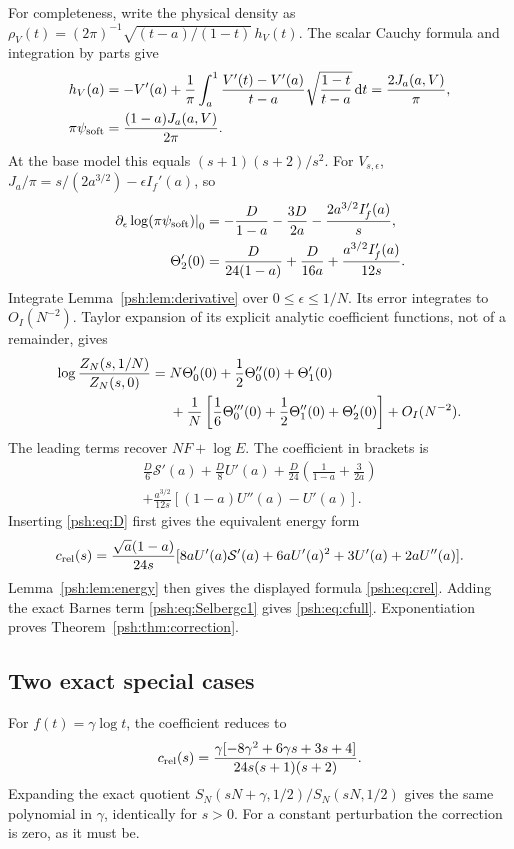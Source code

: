 \documentclass[11pt,a4paper]{article}
\numberwithin{equation}{section}
\theoremstyle{remark}\newtheorem{remark}[theorem]{Remark}
\newcommand{\dd}{\,\mathrm d}
\begin{document}
For completeness, write the physical density as
$\rho_V(t)=(2\pi)^{-1}\sqrt{(t-a)/(1-t)}\,h_V(t)$.
The scalar Cauchy formula and integration by parts give
\begin{align}
 h_V(a)&=-V'(a)+\frac1\pi\int_a^1
     \frac{V'(t)-V'(a)}{t-a}\sqrt{\frac{1-t}{t-a}}\dd t
       =\frac{2J_a(a,V)}\pi,\notag\\
 \pi\psi_{\rm soft}&=\frac{(1-a)J_a(a,V)}{2\pi}.\label{psh:eq:softfactor}
\end{align}
At the base model this equals $(s+1)(s+2)/s^2$. For $V_{s,\epsilon}$,
$J_a/\pi=s/(2a^{3/2})-\epsilon I_f'(a)$, so
\begin{align}
 \left.\partial_\epsilon\log(\pi\psi_{\rm soft})\right|_0
   &=-\frac D{1-a}-\frac{3D}{2a}-\frac{2a^{3/2}I_f'(a)}s,\notag\\
 \Theta_2'(0)&=\frac D{24(1-a)}+\frac D{16a}
                         +\frac{a^{3/2}I_f'(a)}{12s}.\label{psh:eq:E2diff}
\end{align}
Integrate Lemma~\ref{psh:lem:derivative} over $0\leq\epsilon\leq1/N$.
Its error integrates to $O_I(N^{-2})$. Taylor expansion of its explicit
analytic coefficient functions, not of a remainder, gives
\begin{align}
 \log\frac{Z_N(s,1/N)}{Z_N(s,0)}
 ={}&N\Theta_0'(0)+\frac12\Theta_0''(0)+\Theta_1'(0)\notag\\
 &+\frac1N\left[\frac16\Theta_0'''(0)+\frac12\Theta_1''(0)+\Theta_2'(0)\right]
      +O_I(N^{-2}).\label{psh:eq:intderivative}
\end{align}
The leading terms recover $NF+\log E$. The coefficient in brackets is
\begin{multline}\label{psh:eq:cD}
 \frac D6\mathcal S'(a)+\frac D8U'(a)
 +\frac D{24}\left(\frac1{1-a}+\frac3{2a}\right)\\
 +\frac{a^{3/2}}{12s}[(1-a)U''(a)-U'(a)].
\end{multline}
Inserting \eqref{psh:eq:D} first gives the equivalent energy form
\begin{equation}\label{psh:eq:cenergy}
 c_{\rm rel}(s)=\frac{\sqrt a(1-a)}{24s}
 [8aU'(a)\mathcal S'(a)+6aU'(a)^2+3U'(a)+2aU''(a)].
\end{equation}
Lemma~\ref{psh:lem:energy} then gives the displayed formula \eqref{psh:eq:crel}.
Adding the exact Barnes term \eqref{psh:eq:Selbergc1} gives
\eqref{psh:eq:cfull}. Exponentiation proves Theorem~\ref{psh:thm:correction}.

\subsection{Two exact special cases}
For $f(t)=\gamma\log t$, the coefficient reduces to
\begin{equation}\label{psh:eq:cLog}
 c_{\rm rel}(s)=
 \frac{\gamma[-8\gamma^2+6\gamma s+3s+4]}{24s(s+1)(s+2)}.
\end{equation}
Expanding the exact quotient $S_N(sN+\gamma,1/2)/S_N(sN,1/2)$
gives the same polynomial in $\gamma$, identically for $s>0$.
For a constant perturbation the correction is zero, as it must be.
\end{document}
